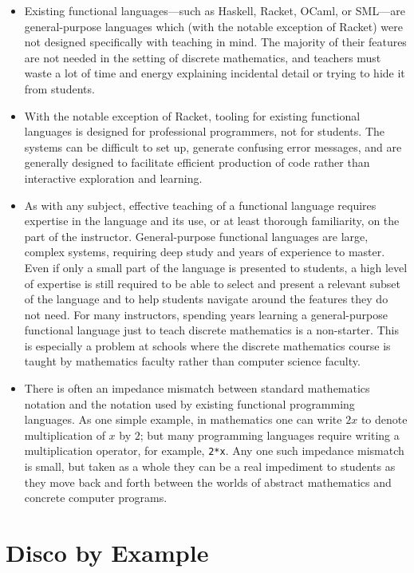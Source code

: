 \documentclass[submission,copyright,creativecommons]{eptcs}
\begin{document}
\begin{itemize}
\item Existing functional languages---such as Haskell, Racket, OCaml,
  or SML---are general-purpose languages which (with the notable
  exception of Racket) were not designed specifically with teaching in
  mind.  The majority of their features are not needed in the setting
  of discrete mathematics, and teachers must waste a lot of time and
  energy explaining incidental detail or trying to hide it from
  students.
\item With the notable exception of Racket, tooling for existing
  functional languages is designed for professional programmers, not
  for students.  The systems can be difficult to set up, generate
  confusing error messages, and are generally designed to facilitate
  efficient production of code rather than interactive exploration and
  learning.
\item As with any subject, effective teaching of a functional language
  requires expertise in the language and its use, or at least thorough
  familiarity, on the part of the instructor. General-purpose
  functional languages are large, complex systems, requiring deep
  study and years of experience to master.  Even if only a small part
  of the language is presented to students, a high level of expertise
  is still required to be able to select and present a relevant subset
  of the language and to help students navigate around the features
  they do not need.  For many instructors, spending years learning a
  general-purpose functional language just to teach discrete
  mathematics is a non-starter.  This is especially a problem at
  schools where the discrete mathematics course is taught by
  mathematics faculty rather than computer science faculty.
\item There is often an impedance mismatch between standard
  mathematics notation and the notation used by existing functional
  programming languages.  As one simple example, in mathematics one
  can write $2x$ to denote multiplication of $x$ by $2$; but many
  programming languages require writing a multiplication operator, for
  example, \texttt{2*x}.  Any one such impedance mismatch is small, but taken
  as a whole they can be a real impediment to students as they move
  back and forth between the worlds of abstract mathematics and
  concrete computer programs.
\end{itemize}

\section{Disco by Example}
\end{document}
